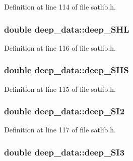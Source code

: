 Definition at line 114 of file satlib.\-h.

\hypertarget{structdeep__data_a4c54b8017a129fc3d10cd282cd5105e5}{
\subsubsection[{deep\-\_\-\-S\-H\-L}]{\setlength{\rightskip}{0pt plus 5cm}double deep\-\_\-data\-::deep\-\_\-\-S\-H\-L}}\label{structdeep__data_a4c54b8017a129fc3d10cd282cd5105e5}


Definition at line 116 of file satlib.\-h.

\hypertarget{structdeep__data_a9fcfc26f321c9c3fd73b31e3572192af}{
\subsubsection[{deep\-\_\-\-S\-H\-S}]{\setlength{\rightskip}{0pt plus 5cm}double deep\-\_\-data\-::deep\-\_\-\-S\-H\-S}}\label{structdeep__data_a9fcfc26f321c9c3fd73b31e3572192af}


Definition at line 115 of file satlib.\-h.

\hypertarget{structdeep__data_a22e1fdb5f1e1b6893d23d466062115bc}{
\subsubsection[{deep\-\_\-\-S\-I2}]{\setlength{\rightskip}{0pt plus 5cm}double deep\-\_\-data\-::deep\-\_\-\-S\-I2}}\label{structdeep__data_a22e1fdb5f1e1b6893d23d466062115bc}


Definition at line 117 of file satlib.\-h.

\hypertarget{structdeep__data_a15d41fc01e18e7f105695db6ac96ea45}{
\subsubsection[{deep\-\_\-\-S\-I3}]{\setlength{\rightskip}{0pt plus 5cm}double deep\-\_\-data\-::deep\-\_\-\-S\-I3}}\label{structdeep__data_a15d41fc01e18e7f105695db6ac96ea45}


